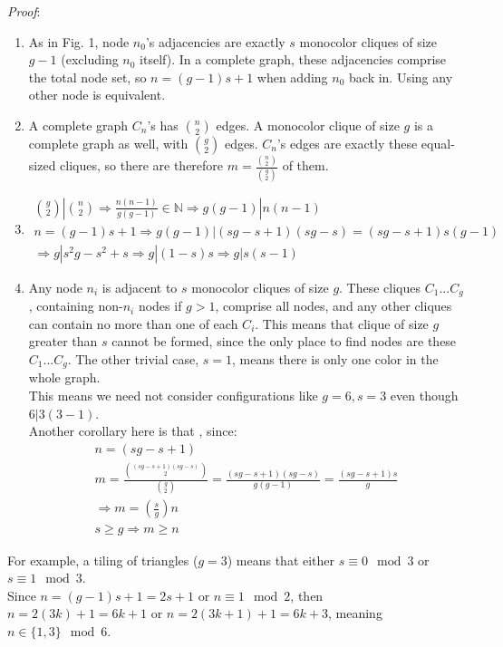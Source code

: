 \documentclass[11pt, oneside]{article} 	%
\begin{document}
\emph{Proof}:
\begin{enumerate}
\item As in Fig. 1, node $n_0$'s adjacencies are exactly $s$ monocolor cliques of size $g-1$ (excluding $n_0$ itself).  In a complete graph, these adjacencies comprise the total node set, so $n = (g-1)s + 1$ when adding $n_0$ back in.  Using any other node is equivalent.
\item A complete graph $C_n$'s has ${n \choose 2}$ edges.  A monocolor clique of size $g$ is a complete graph as well, with ${g \choose 2}$ edges.  $C_n$'s edges are exactly these equal-sized cliques, so there are therefore $m = \frac{{n \choose 2}}{{g \choose 2}}$ of them.
\item 
\begin{align}
{g \choose 2} | {n \choose 2} \Rightarrow \frac{n(n-1)}{g(g-1)} \in \mathbb{N} \Rightarrow g(g-1) | n(n-1) \\
 n = (g-1)s+1 \Rightarrow g(g-1) | (sg-s+1)(sg-s) = (sg-s+1)s(g-1)\\
\Rightarrow g | s^2g - s^2 + s \Rightarrow g | (1-s)s \Rightarrow g | s(s-1) 
\end{align}
\item Any node $n_i$ is adjacent to $s$ monocolor cliques of size $g$.  These cliques $C_1 ... C_g$, containing non-$n_i$ nodes if $g > 1$, comprise all nodes, and any other cliques can contain no more than one of each $C_i$.  This means that clique of size $g$ greater than $s$ cannot be formed, since the only place to find nodes are these $C_1 ... C_g$.  The other trivial case, $s=1$, means there is only one color in the whole graph. 
\\

This means we need not consider configurations like $g = 6, s=3$ even though $6 | 3(3-1)$.
\\
Another corollary here is that , since:
\begin{align}
n = (sg - s + 1) \\
m = \frac{{(sg - s + 1)(sg-s) \choose 2}}{{g \choose 2}} = \frac{(sg-s+1)(sg-s)}{g(g-1)} = \frac{(sg-s+1)s}{g} \\
\Rightarrow m = (\frac{s}{g})n\\
s \geq g \Rightarrow m \geq n
\end{align}
\end{enumerate}

For example, a tiling of triangles ($g=3$) means that either $s \equiv 0 \mod 3$ or $s \equiv 1 \mod 3$.  
\\
Since $n = (g-1)s + 1 = 2s + 1$ or $n \equiv 1 \mod 2$, then $n = 2(3k) + 1 = 6k+1$ or $n = 2(3k+1) + 1 = 6k+3$, meaning $n \in \{1,3\} \mod 6$.
\end{document}
